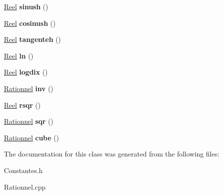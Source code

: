 \begin{DoxyCompactItemize}
\item 
\hypertarget{class_calcul_1_1_rationnel_ae0363bd5486c42df55e603b635ac200c}{\hyperlink{class_calcul_1_1_reel}{Reel} {\bfseries sinush} ()}\label{class_calcul_1_1_rationnel_ae0363bd5486c42df55e603b635ac200c}

\item 
\hypertarget{class_calcul_1_1_rationnel_a90d87e81824f819b74946a1b999f79e6}{\hyperlink{class_calcul_1_1_reel}{Reel} {\bfseries cosinush} ()}\label{class_calcul_1_1_rationnel_a90d87e81824f819b74946a1b999f79e6}

\item 
\hypertarget{class_calcul_1_1_rationnel_a8d25f43222dcf910a36cecac200ece3e}{\hyperlink{class_calcul_1_1_reel}{Reel} {\bfseries tangenteh} ()}\label{class_calcul_1_1_rationnel_a8d25f43222dcf910a36cecac200ece3e}

\item 
\hypertarget{class_calcul_1_1_rationnel_a5113ac88809796974e86ebe24162439f}{\hyperlink{class_calcul_1_1_reel}{Reel} {\bfseries ln} ()}\label{class_calcul_1_1_rationnel_a5113ac88809796974e86ebe24162439f}

\item 
\hypertarget{class_calcul_1_1_rationnel_ad3639dfccfc319238c9b4fa84410ed5e}{\hyperlink{class_calcul_1_1_reel}{Reel} {\bfseries logdix} ()}\label{class_calcul_1_1_rationnel_ad3639dfccfc319238c9b4fa84410ed5e}

\item 
\hypertarget{class_calcul_1_1_rationnel_adc850431c749f0702e530133ad577034}{\hyperlink{class_calcul_1_1_rationnel}{Rationnel} {\bfseries inv} ()}\label{class_calcul_1_1_rationnel_adc850431c749f0702e530133ad577034}

\item 
\hypertarget{class_calcul_1_1_rationnel_aa00a6df0e3953fb171462f41fad7fde7}{\hyperlink{class_calcul_1_1_reel}{Reel} {\bfseries rsqr} ()}\label{class_calcul_1_1_rationnel_aa00a6df0e3953fb171462f41fad7fde7}

\item 
\hypertarget{class_calcul_1_1_rationnel_ab46637ec83548958a87fb7ded85c15f9}{\hyperlink{class_calcul_1_1_rationnel}{Rationnel} {\bfseries sqr} ()}\label{class_calcul_1_1_rationnel_ab46637ec83548958a87fb7ded85c15f9}

\item 
\hypertarget{class_calcul_1_1_rationnel_a663bd20d02eedbcd4bb8ab7eeab98086}{\hyperlink{class_calcul_1_1_rationnel}{Rationnel} {\bfseries cube} ()}\label{class_calcul_1_1_rationnel_a663bd20d02eedbcd4bb8ab7eeab98086}

\end{DoxyCompactItemize}


The documentation for this class was generated from the following files\-:\begin{DoxyCompactItemize}
\item 
Constantes.\-h\item 
Rationnel.\-cpp\end{DoxyCompactItemize}
